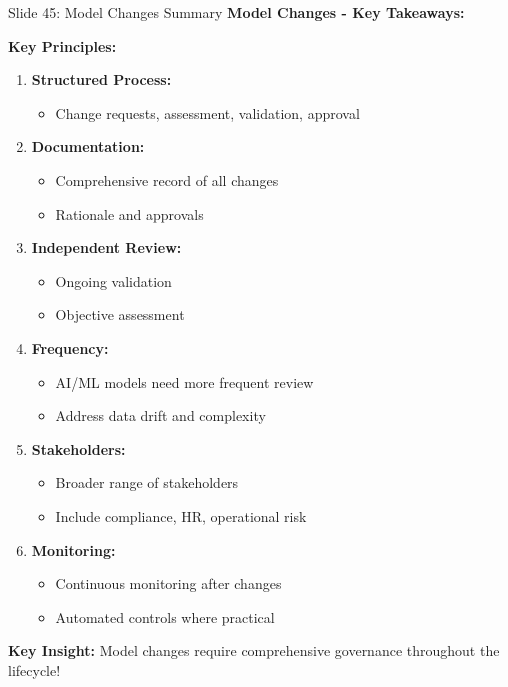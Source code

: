 \documentclass[8pt]{beamer}
\begin{document}
	\begin{frame}{Slide 45: Model Changes Summary}
		\fontsize{6.5}{7.5}\selectfont
		\textbf{Model Changes - Key Takeaways:}
		
		\vspace{0.1cm}
		\textbf{Key Principles:}
		\begin{enumerate}
			\item \textbf{Structured Process:}
			\begin{itemize}
				\item Change requests, assessment, validation, approval
			\end{itemize}
			\item \textbf{Documentation:}
			\begin{itemize}
				\item Comprehensive record of all changes
				\item Rationale and approvals
			\end{itemize}
			\item \textbf{Independent Review:}
			\begin{itemize}
				\item Ongoing validation
				\item Objective assessment
			\end{itemize}
			\item \textbf{Frequency:}
			\begin{itemize}
				\item AI/ML models need more frequent review
				\item Address data drift and complexity
			\end{itemize}
			\item \textbf{Stakeholders:}
			\begin{itemize}
				\item Broader range of stakeholders
				\item Include compliance, HR, operational risk
			\end{itemize}
			\item \textbf{Monitoring:}
			\begin{itemize}
				\item Continuous monitoring after changes
				\item Automated controls where practical
			\end{itemize}
		\end{enumerate}
		
		\textcolor{myblue}{\textbf{Key Insight:}} Model changes require \textcolor{myblue}{comprehensive governance throughout the lifecycle}!
	\end{frame}
	
\end{document}
